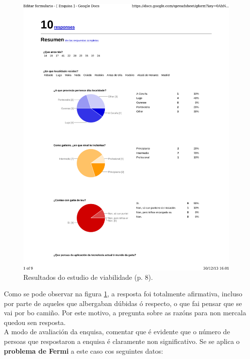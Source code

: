 \begin{figure}[htbp]
 \centering
 \includegraphics[trim=0 12cm 0 11cm,clip=true,scale=0.7,page=8,keepaspectratio=true]{./imagenes/enquisa.pdf}
 \caption{Resultados do estudio de viabilidade (p. 8).}
 \label{figura:ResultadosEstudioViabilidade8}
\end{figure}

Como se pode observar na figura \ref{figura:ResultadosEstudioViabilidade8}, a
resposta foi totalmente afirmativa, incluso por parte de aqueles que albergaban
dúbidas ó respecto, o que fai pensar que se vai por bo camiño. Por este motivo,
a pregunta sobre as razóns para non mercala quedou sen resposta. \\

A modo de avaliación da enquisa, comentar que é evidente que o número de
persoas que respostaron a enquisa é claramente non significativo. Se se aplica
o \textbf{problema de Fermi} \cite{ProblemaFermi} a este caso cos seguintes
datos:

